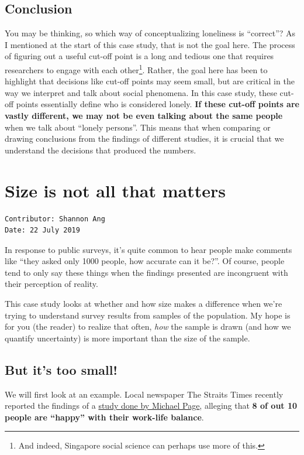 \documentclass[openany]{book}
\let\rmarkdownfootnote\footnote%
\def\footnote{\protect\rmarkdownfootnote}
\begin{document}
\section{Conclusion}\label{conclusion-1}

You may be thinking, so which way of conceptualizing loneliness is
``correct''? As I mentioned at the start of this case study, that is not
the goal here. The process of figuring out a useful cut-off point is a
long and tedious one that requires researchers to engage with each
other\footnote{And indeed, Singapore social science can perhaps use more
  of this.}. Rather, the goal here has been to highlight that decisions
like cut-off points may seem small, but are critical in the way we
interpret and talk about social phenomena. In this case study, these
cut-off points essentially define who is considered lonely. \textbf{If
these cut-off points are vastly different, we may not be even talking
about the same people} when we talk about ``lonely persons''. This means
that when comparing or drawing conclusions from the findings of
different studies, it is crucial that we understand the decisions that
produced the numbers.

\chapter{Size is not all that matters}\label{samples}

\begin{verbatim}
Contributor: Shannon Ang
Date: 22 July 2019
\end{verbatim}

In response to public surveys, it's quite common to hear people make
comments like ``they asked only 1000 people, how accurate can it be?''.
Of course, people tend to only say these things when the findings
presented are incongruent with their perception of reality.

This case study looks at whether and how size makes a difference when
we're trying to understand survey results from samples of the
population. My hope is for you (the reader) to realize that often,
\emph{how} the sample is drawn (and how we quantify uncertainty) is more
important than the size of the sample.

\section{But it's too small!}\label{sample-worklife}

We will first look at an example. Local newspaper The Straits Times
recently reported the findings of a
\href{https://www.michaelpage.com.sg/advice/career-advice/work-life-balance/singapore-happy-work}{study
done by Michael Page}, alleging that \textbf{8 of out 10 people are
``happy'' with their work-life balance}.
\end{document}
